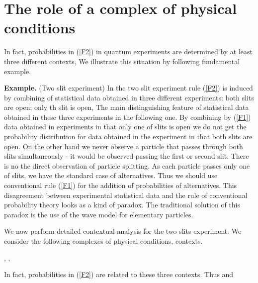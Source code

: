 \documentclass[12pt,oneside,final,a4paper]{article}
\begin{document}
\section{The role of a complex of physical conditions}

In fact, probabilities in (\ref{F2}) in quantum experiments 
are determined by at least three different contexts,
\coordHE{} We illustrate this situation by following fundamental example.

{\bf Example.} (Two slit experiment) In the two slit experiment rule (\ref{F2}) is induced by
combining of statistical data obtained in three different experiments: 
both slits are open; only \coordHE{}th slit is open, \coordHE{} The main distinguishing feature
of statistical data obtained in these three experiments in the following one. 
By combining by (\ref{F1}) data
obtained in experiments in that only one of slits is open we do not get the probability distribution for
data obtained in the experiment in that both slits are open. On the other hand we never observe a particle
that passes through both slits simultaneously - it would be observed passing the first or second 
slit. There  is no the direct observation of particle splitting. As each particle passes  only one of slits,
we have the standard case of alternatives. Thus we should use conventional rule (\ref{F1}) for
the addition of probabilities of alternatives. This disagreement between experimental statistical
data and the rule of conventional probability theory looks as a kind of paradox. The traditional
solution of this paradox is the use of the wave model for elementary particles.

We now perform detailed contextual analysis for the two slits experiment. We consider the following
complexes of physical conditions, contexts.

, , \coordHE{} 

In fact, probabilities in (\ref{F2}) are related to these three contexts.
Thus \coordHE{} and \coordHE{} 
\end{document}
